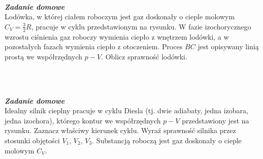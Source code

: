 \documentclass[11pt,a4paper]{article}
\newcounter{zaddom}\newcommand{\zaddom}[1][]{\addtocounter{zaddom}{1} ~\\  {\bf \emph{Zadanie domowe \arabic{zaddom} #1 }} \\}
\begin{document}
\begin{figure}\vspace{-5mm}
\end{figure}
\zaddom
Lodówka, w której ciałem roboczym jest gaz doskonały
o cieple molowym $C_V=\frac{3}{2} R$, pracuje w cyklu przedstawionym na rysunku.
W fazie izochorycznego wzrostu ciśnienia gaz roboczy wymienia ciepło
z wnętrzem lodówki, a w pozostałych fazach wymienia ciepło z otoczeniem.
Proces $BC$ jest opisywany linią prostą we współrzędnych $p-V$.
Oblicz sprawność lodówki.

~\vspace*{1cm}
 
\begin{figure}\vspace{-5mm}
\end{figure}
\zaddom
Idealny silnik cieplny pracuje w cyklu Diesla (tj. dwie adiabaty, jedna izobara, jedna izochora),
którego kontur we współrzędnych $p-V$ przedstawiony jest na rysunku.
Zaznacz właściwy kierunek cyklu.
Wyraź sprawność silnika przez stosunki objętości $V_1$, $V_2$, $V_3$.
Substancją roboczą jest gaz doskonały o cieple molowym $C_V$.\\[1mm]
\end{document}
